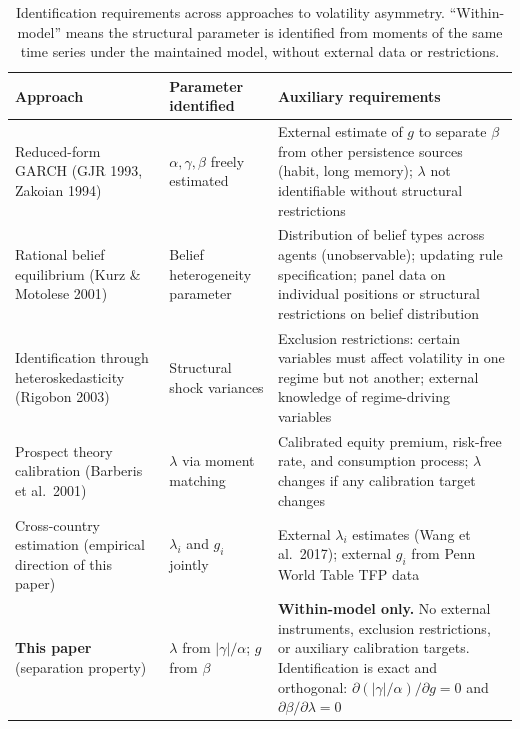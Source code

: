 \documentclass[12pt,a4paper]{article}
\theoremstyle{definition}
\begin{document}
\begin{table}[ht]
\centering
\caption{Identification requirements across approaches to volatility
asymmetry. ``Within-model'' means the structural parameter is identified
from moments of the same time series under the maintained model, without
external data or restrictions.}
\label{tab:identification_comparison}
\small
\begin{tabular}{p{3.8cm}p{3.0cm}p{5.8cm}}
\toprule
\textbf{Approach} & \textbf{Parameter identified} & \textbf{Auxiliary requirements} \\
\midrule
Reduced-form GARCH \newline (GJR 1993, Zakoian 1994)
  & $\alpha, \gamma, \beta$ freely estimated
  & External estimate of $g$ to separate $\beta$ from
    other persistence sources (habit, long memory);
    $\lambda$ not identifiable without structural
    restrictions \\[6pt]
Rational belief equilibrium \newline (Kurz \& Motolese 2001)
  & Belief heterogeneity parameter
  & Distribution of belief types across agents
    (unobservable); updating rule specification;
    panel data on individual positions or structural
    restrictions on belief distribution \\[6pt]
Identification through \newline heteroskedasticity \newline (Rigobon 2003)
  & Structural shock variances
  & Exclusion restrictions: certain variables must
    affect volatility in one regime but not another;
    external knowledge of regime-driving variables \\[6pt]
Prospect theory calibration \newline (Barberis et al.\ 2001)
  & $\lambda$ via moment matching
  & Calibrated equity premium, risk-free rate, and
    consumption process; $\lambda$ changes if any
    calibration target changes \\[6pt]
Cross-country estimation \newline (empirical direction of this paper)
  & $\lambda_i$ and $g_i$ jointly
  & External $\lambda_i$ estimates (Wang et al.\ 2017);
    external $g_i$ from Penn World Table TFP data \\[6pt]
\textbf{This paper} \newline (separation property)
  & $\lambda$ from $|\gamma|/\alpha$; \newline $g$ from $\beta$
  & \textbf{Within-model only.} No external instruments,
    exclusion restrictions, or auxiliary calibration
    targets. Identification is exact and orthogonal:
    $\partial(|\gamma|/\alpha)/\partial g = 0$ and
    $\partial\beta/\partial\lambda = 0$ \\
\bottomrule
\end{tabular}
\end{table}
\end{document}
